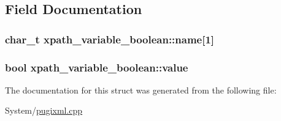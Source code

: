 \subsection{Field Documentation}
\hypertarget{structxpath__variable__boolean_a2b2cb81ee5c9a19a667428d08d5bb951}{
\subsubsection[{name}]{\setlength{\rightskip}{0pt plus 5cm}char\-\_\-t xpath\-\_\-variable\-\_\-boolean\-::name\mbox{[}1\mbox{]}}}\label{structxpath__variable__boolean_a2b2cb81ee5c9a19a667428d08d5bb951}
\hypertarget{structxpath__variable__boolean_ab54117a6cced8c3e029724651df4d404}{
\subsubsection[{value}]{\setlength{\rightskip}{0pt plus 5cm}bool xpath\-\_\-variable\-\_\-boolean\-::value}}\label{structxpath__variable__boolean_ab54117a6cced8c3e029724651df4d404}


The documentation for this struct was generated from the following file\-:\begin{DoxyCompactItemize}
\item 
System/\hyperlink{pugixml_8cpp}{pugixml.\-cpp}\end{DoxyCompactItemize}
